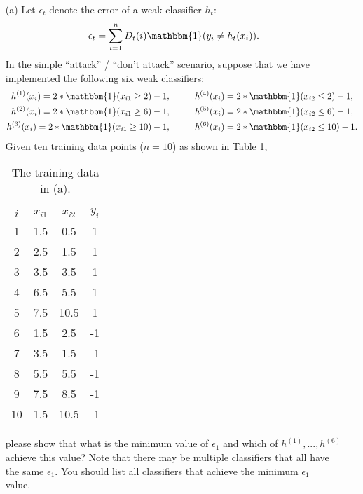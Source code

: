 \documentclass[10pt]{article}
\begin{document}
\begin{enumerate}
	    \begin{itemize}
            \item[(a)] Let $\epsilon_t$ denote the error of a weak classifier $h_t$:
		        \begin{align*}
		            \epsilon_{t} = \sum_{i=1}^{n} D_{t}(i) \mathbbm{1}(y_{i} \neq h_{t}(x_{i})).
		        \end{align*}
		        In the simple “attack” / “don’t attack” scenario, suppose that we have implemented the following six weak classifiers:
		        \begin{align*}
		            h^{(1)}(x_{i}) = 2 * \mathbbm{1}(x_{i1} \geq 2) - 1, \hspace{1cm}  & h^{(4)}(x_{i}) = 2 * \mathbbm{1}(x_{i2} \leq 2) - 1,  \\
			        h^{(2)}(x_{i}) = 2 * \mathbbm{1}(x_{i1} \geq 6) - 1, \hspace{1cm}  & h^{(5)}(x_{i}) = 2 * \mathbbm{1}(x_{i2} \leq 6) - 1,  \\
			        h^{(3)}(x_{i}) = 2 * \mathbbm{1}(x_{i1} \geq 10) - 1, \hspace{1cm} & h^{(6)}(x_{i}) = 2 * \mathbbm{1}(x_{i2} \leq 10) - 1. \\
		        \end{align*}
		        Given ten training data points ($n = 10$) as shown in Table 1,
		        \begin{table}[t]
                    \caption{The training data in (a).}
                    \label{table1}
                    \centering
                    \begin{tabular}{|c|cc|c|}
                    \hline
                    $i$ & $x_{i1}$ & $x_{i2}$ & $y_{i}$ \\ \hline
                    1 & 1.5 & 0.5 & 1 \\
                    2 & 2.5 & 1.5 & 1 \\
                    3 & 3.5 & 3.5 & 1 \\
                    4 & 6.5 & 5.5 & 1 \\
                    5 & 7.5 & 10.5 & 1 \\
                    6 & 1.5 & 2.5 & -1 \\
                    7 & 3.5 & 1.5 & -1 \\
                    8 & 5.5 & 5.5 & -1 \\
                    9 & 7.5 & 8.5 & -1 \\
                    10 & 1.5 & 10.5 & -1 \\
                    \hline
                    \end{tabular}
                \end{table}
		        please show that what is the minimum value of $\epsilon_{1}$ and which of $h^{(1)},...,h^{(6)}$ achieve this value? Note that there may be multiple classifiers that all have the same $\epsilon_{1}$. You should list all classifiers that achieve the minimum $\epsilon_{1}$ value.~\\


\end{itemize}
\end{enumerate}
\end{document}

